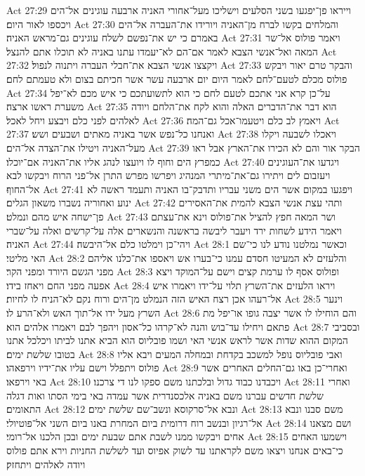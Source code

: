 Act 27:29  וייראו פן־יפגעו בשני הסלעים וישליכו מעל־אחורי האניה ארבעה עוגינים אל־הים ויכספו לאור היום׃
Act 27:30  והמלחים בקשו לברח מן־האניה ויורידו את־העברה אל־הים באמרם כי יש את־נפשם לשלח עוגינים גם־מראש האניה׃
Act 27:31  ויאמר פולוס אל־שר המאה ואל־אנשי הצבא לאמר אם־הם לא־יעמדו עתנו באניה לא תוכלו אתם להנצל׃
Act 27:32  ויקצצו אנשי הצבא את־חבלי העברה ויתנוה לנפול׃
Act 27:33  והבקר טרם יאור ויבקש פולוס מכלם לטעם־לחם לאמר היום יום ארבעה עשר אשר חכיתם בצום ולא טעמתם לחם׃
Act 27:34  על־כן קרא אני אתכם לטעם לחם כי הוא לתשועתכם כי איש מכם לא־יפל משערת ראשו ארצה׃
Act 27:35  הוא דבר את־הדברים האלה והוא לקח את־הלחם ויודה לאלהים לפני כלם ויבצע ויחל לאכל׃
Act 27:36  ויאמץ לב כלם ויטעמו־אכל גם־המה׃
Act 27:37  ואנחנו כל־נפש אשר באניה מאתים ושבעים ושש׃
Act 27:38  ויאכלו לשבעה ויקלו מעל־האניה ויטילו את־הצדה אל־הים׃
Act 27:39  הבקר אור והם לא הכירו את־הארץ אבל ראו כמפרץ הים וחוף לו ויועצו לנהג אליו את־האניה אם־יוכלו׃
Act 27:40  ויגדעו את־העוגינים ויעזבום לים ויתירו גם־את־מיתרי המנהיג ויפרשו מפרש התרן אל־פני הרוח ויבקשו לבא אל־החוף׃
Act 27:41  ויפגעו במקום אשר הים משני עבריו ותדבק־בו האניה ותעמד ראשה לא ינוע ואחוריה נשברו משאון הגלים׃
Act 27:42  ותהי עצת אנשי הצבא להמית את־האסירים פן־ישחה איש מהם ונמלט׃
Act 27:43  ושר המאה חפץ להציל את־פולוס וינא את־עצתם ויאמר הידע לשחות ירד ויעבר ליבשה בראשנה והנשארים אלה על־קרשים ואלה על־שברי האניה׃
Act 27:44  ויהי־כן וימלטו כלם אל־היבשה׃
Act 28:1  וכאשר נמלטנו נודע לנו כי־שם האי מליטי׃
Act 28:2  והלעזים לא המעיטו חסדם עמנו כי־בערו אש ויאספו את־כלנו אליהם מפני הגשם היורד ומפני הקר׃
Act 28:3  ופולוס אסף לו ערמת קצים וישם על־המוקד ויצא אפעה מפני החם ויאחז בידו׃
Act 28:4  ויראו הלעזים את־השרץ תלוי על־ידו ויאמרו איש אל־רעהו אכן רצח האיש הזה הנמלט מן־הים ורוח נקם לא־הניח לו לחיות׃
Act 28:5  וינער השרץ מעל ידו אל־תוך האש ולא־הרע לו׃
Act 28:6  והם הוחילו לו אשר יצבה גופו או־יפל מת פתאם ויחילו עד־בוש והנה לא־קרהו כל־אסון ויהפך לבם ויאמרו אלהים הוא׃
Act 28:7  ובסביבי המקום ההוא שדות אשר לראש אנשי האי ושמו פובליוס הוא הביא אתנו לביתו ויכלכל אתנו בטובו שלשת ימים׃
Act 28:8  ואבי פובליוס נופל למשכב בקדחת ובמחלה המעים ויבא אליו פולוס ויתפלל וישם עליו את־ידיו וירפאהו׃
Act 28:9  ואחרי־כן באו גם־החלים האחרים אשר באי וירפאו׃
Act 28:10  ויכבדנו כבוד גדול ובלכתנו משם ספקו לנו די צרכנו׃
Act 28:11  ואחרי שלשת חדשים עברנו משם באניה אלכסנדרית אשר עמדה באי בימי הסתו ואות דגלה התאומים׃
Act 28:12  ונבא אל־סרקוסא ונשב־שם שלשת ימים׃
Act 28:13  משם סבנו ונבא אל־רגיון ובנשב רוח דרומית ביום המחרת באנו ביום השני אל־פוטיולי׃
Act 28:14  ושם מצאנו אחים ויבקשו ממנו לשבת אתם שבעת ימים ובכן הלכנו אל־רומי׃
Act 28:15  וישמעו האחים כי־באים אנחנו ויצאו משם לקראתנו עד לשוק אפיוס ועד לשלשת החניות וירא אתם פולוס ויודה לאלהים ויתחזק׃
